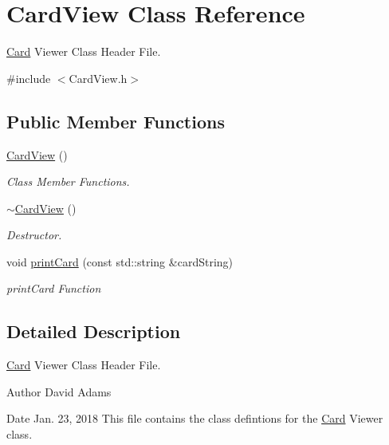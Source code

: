 \hypertarget{classCardView}{\section{Card\-View Class Reference}
\label{classCardView}
}


\hyperlink{classCard}{Card} Viewer Class Header File.  




{\ttfamily \#include $<$Card\-View.\-h$>$}

\subsection*{Public Member Functions}
\begin{DoxyCompactItemize}
\item 
\hyperlink{classCardView_aff7d5ccc76a86dce3c9a1d9196af7ef0}{Card\-View} ()
\begin{DoxyCompactList}\small\item\em Class Member Functions. \end{DoxyCompactList}\item 
\hyperlink{classCardView_a17b7230ebe9a2e47cd86f0efc27c92e4}{$\sim$\-Card\-View} ()
\begin{DoxyCompactList}\small\item\em Destructor. \end{DoxyCompactList}\item 
void \hyperlink{classCardView_a1be9d828918909673f896e8409f5177e}{print\-Card} (const std\-::string \&card\-String)
\begin{DoxyCompactList}\small\item\em print\-Card Function \end{DoxyCompactList}\end{DoxyCompactItemize}


\subsection{Detailed Description}
\hyperlink{classCard}{Card} Viewer Class Header File. 

\begin{DoxyAuthor}{Author}
David Adams 
\end{DoxyAuthor}
\begin{DoxyDate}{Date}
Jan. 23, 2018 This file contains the class defintions for the \hyperlink{classCard}{Card} Viewer class. 
\end{DoxyDate}


